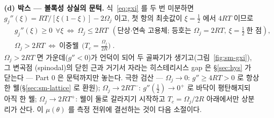 \documentclass[11pt,a4paper]{article}
\begin{document}
\textbf{(d) 박스 --- 볼록성 상실의 문턱.} 식~\eqref{eq:gxi} 를 두 번 미분하면
$g_j''(\xi)=RT/[\xi(1-\xi)]-2\Omega_j$ 이고, 첫 항의 최솟값이 $\xi=\tfrac12$ 에서 $4RT$ 이므로
\begin{equation}
\boxed{\;
\begin{aligned}
&g_j''(\xi)\ge0\ \ \forall\xi\ \Longleftrightarrow\ \Omega_j\le2RT\ \ (\text{단상·연속 고용체; 등호는 }\Omega_j{=}2RT,\ \xi{=}\tfrac12\ \text{한 점}),\\
&\Omega_j>2RT\ \Longleftrightarrow\ \text{이중웰}\ \ \Big(T_c=\frac{\Omega_j}{2R}\Big)\;.
\end{aligned}}
\label{eq:sm-thresh}
\end{equation}
$\Omega_j>2RT$ 면 가운데($g''<0$)가 언덕이 되어 두 골짜기가 생기고(그림~\ref{fig:sm-gxi}), 그 변곡점
(spinodal)의 닫힌 근과 거기서 자라는 히스테리시스 gap 은 \S\ref{sec:hys} 가 닫는다 --- Part 0 은 문턱까지만
놓는다. 극한 검산 --- $\Omega_j\to0$: $g''\ge4RT>0$ 로 항상 한 웰(\S\ref{sec:sm-lattice} 로 환원);
$\Omega_j\to2RT^-$: $g''(\tfrac12)\to0^+$ 로 바닥이 평탄해지되 아직 한 웰; $\Omega_j\to2RT^+$: 웰이 둘로
갈라지기 시작하고 $T_c=\Omega_j/2R$ 아래에서만 상분리가 산다. 이 $\mu(\theta)$ 를 측정 전위에 결선하는
것이 다음 소절이다.
\end{document}
